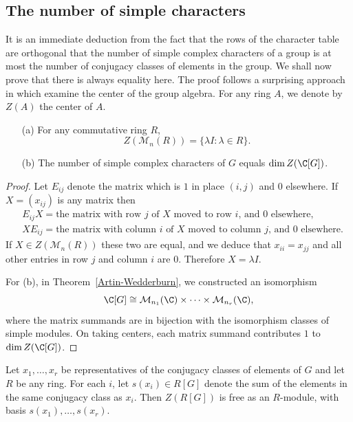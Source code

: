 \subsection{The number of simple characters}
It is an immediate deduction from the fact that the rows of the character table are orthogonal that the number of simple complex characters of a group is at most the number of conjugacy classes of elements in the group. We shall now prove that there is always equality here. The proof follows a surprising approach in which examine the center of the group algebra. For any ring $A$, we denote by $Z(A)$ the center of $A$.
\begin{lemma}\label{matrix algebra center}
\mbox{}
\begin{itemize}
\item[(a)] For any commutative ring $R$,
\[Z(\mathcal{M}_n(R))=\{\lambda I:\lambda\in R\}.\] 
\item[(b)] The number of simple complex characters of $G$ equals $\dim Z(\C[G])$.
\end{itemize}
\end{lemma}
\begin{proof}
Let $E_{ij}$ denote the matrix which is $1$ in place $(i,j)$ and $0$ elsewhere. If $X=(x_{ij})$ is any matrix then
\begin{align*}
&E_{ij}X=\text{the matrix with row $j$ of $X$ moved to row $i$, and $0$ elsewhere},\\
&XE_{ij}=\text{the matrix with column $i$ of $X$ moved to column $j$, and $0$ elsewhere.}
\end{align*}
If $X\in Z(\mathcal{M}_n(R))$ these two are equal, and we deduce that $x_{ii}=x_{jj}$ and all other entries in row $j$ and column $i$ are $0$. Therefore $X=\lambda I$.\par
For (b), in Theorem~\ref{Artin-Wedderburn}, we constructed an isomorphism
\[\C[G]\cong\mathcal{M}_{n_1}(\C)\times\cdots\times\mathcal{M}_{n_r}(\C),\]
where the matrix summands are in bijection with the isomorphism classes of simple modules. On taking centers, each matrix summand contributes $1$ to $\dim Z(\C[G])$.
\end{proof}
\begin{lemma}\label{group ring center basis}
Let $x_1,\dots,x_r$ be representatives of the conjugacy classes of elements of $G$ and let $R$ be any ring. For each $i$, let $s(x_i)\in R[G]$ denote the sum of the elements in the same conjugacy class as $x_i$. Then $Z(R[G])$ is free as an $R$-module, with basis $s(x_1),\dots,s(x_r)$.
\end{lemma}
